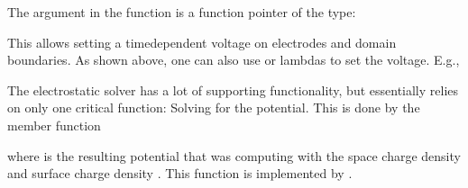 \documentclass[letterpaper,10pt,english]{sphinxmanual}
\begin{document}
The argument in the function  is a function pointer of the type:

\begin{sphinxVerbatim}[commandchars=\\\{\},formatcom=\scriptsize]
   
\end{sphinxVerbatim}

This allows setting a time\sphinxhyphen{}dependent voltage on electrodes and domain boundaries.
As shown above, one can also use  or lambdas to set the voltage.
E.g.,

\begin{sphinxVerbatim}[commandchars=\\\{\},formatcom=\scriptsize]
 

   \PYG{p}{[}\PYG{p}{]}      
    

\end{sphinxVerbatim}

The electrostatic solver  has a lot of supporting functionality, but essentially relies on only one critical function:
Solving for the potential.
This is done by the member function

\begin{sphinxVerbatim}[commandchars=\\\{\},formatcom=\scriptsize]
        
\end{sphinxVerbatim}

where  is the resulting potential that was computing with the space charge density  and surface charge density .
This function is implemented by {\hyperref[\detokenize{Solvers/Electrostatics:chap-fieldsolvermultigrid}]{}}.
\end{document}
